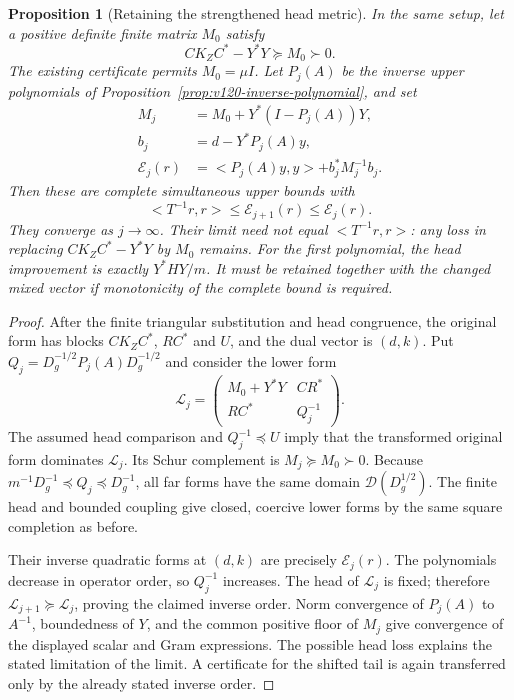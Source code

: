 \documentclass[11pt]{article}
\def\ip#1#2{<#1,#2>}%
\newtheorem{proposition}[theorem]{Proposition}
\theoremstyle{remark}
\newcommand{\ip}[2]{\left\langle #1,#2\right\rangle}
\begin{document}
\begin{proposition}[Retaining the strengthened head metric]
\label{prop:v123-monotone-head}
In the same setup, let a positive definite finite matrix $M_0$
satisfy
\[
 C K_Z C^*-Y^*Y\succeq M_0\succ0.
\]
The existing certificate permits $M_0=\mu I$. Let $P_j(A)$
be the inverse upper polynomials of
Proposition~\ref{prop:v120-inverse-polynomial}, and set
\begin{align*}
 M_j&=M_0+Y^*(I-P_j(A))Y,\\
 b_j&=d-Y^*P_j(A)y,\\
 \mathcal E_j(r)&=\ip{P_j(A)y}{y}+b_j^*M_j^{-1}b_j.
\end{align*}
Then these are complete simultaneous upper bounds with
\begin{equation}\label{eq:v123-monotone-head}
 \ip{T^{-1}r}{r}\le\mathcal E_{j+1}(r)
          \le\mathcal E_j(r).
\end{equation}
They converge as $j\to\infty$. Their limit need not equal
$\ip{T^{-1}r}{r}$: any loss in replacing
$CK_ZC^*-Y^*Y$ by $M_0$ remains.
For the first polynomial, the head improvement is exactly
$Y^*HY/m$. It must be retained together with the changed
mixed vector if monotonicity of the complete bound is required.
\end{proposition}
\begin{proof}
After the finite triangular substitution and head congruence,
the original form has blocks $CK_ZC^*$, $RC^*$ and $U$,
and the dual vector is $(d,k)$. Put
$Q_j=D_g^{-1/2}P_j(A)D_g^{-1/2}$ and consider the lower form
\[
 \mathcal L_j=
 \begin{pmatrix}
 M_0+Y^*Y & CR^*\\
 RC^* & Q_j^{-1}
 \end{pmatrix}.
\]
The assumed head comparison and $Q_j^{-1}\preceq U$ imply
that the transformed original form dominates $\mathcal L_j$.
Its Schur complement is $M_j\succeq M_0\succ0$.
Because $m^{-1}D_g^{-1}\preceq Q_j\preceq D_g^{-1}$,
all far forms have the same domain $\mathcal D(D_g^{1/2})$.
The finite head and bounded coupling give closed, coercive
lower forms by the same square completion as before.

Their inverse quadratic forms at $(d,k)$ are precisely
$\mathcal E_j(r)$. The polynomials decrease in operator order,
so $Q_j^{-1}$ increases. The head of $\mathcal L_j$ is fixed;
therefore $\mathcal L_{j+1}\succeq\mathcal L_j$, proving the
claimed inverse order. Norm convergence of $P_j(A)$ to $A^{-1}$,
boundedness of $Y$, and the common positive floor of $M_j$
give convergence of the displayed scalar and Gram expressions.
The possible head loss explains the stated limitation of the
limit. A certificate for the shifted tail is again transferred
only by the already stated inverse order.
\end{proof}
\end{document}
